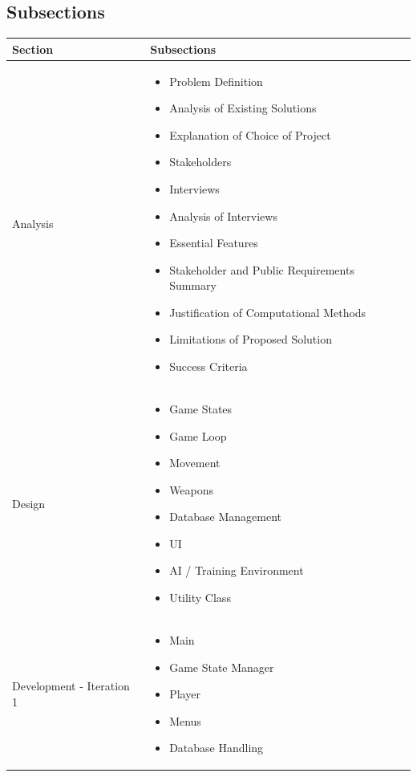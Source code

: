 \subsection{Subsections}

\begin{center}
\begin{longtable}{|p{3.5cm}|p{10cm}|}
    \hline
    Section & Subsections\\
    \hline
    \hline
    Analysis & \begin{itemize}
        \item Problem Definition
        \item Analysis of Existing Solutions
        \item Explanation of Choice of Project
        \item Stakeholders
        \item Interviews
        \item Analysis of Interviews
        \item Essential Features
        \item Stakeholder and Public Requirements Summary
        \item Justification of Computational Methods
        \item Limitations of Proposed Solution
        \item Success Criteria
    \end{itemize}\\
    \hline
    Design & \begin{itemize}
        \item Game States
        \item Game Loop
        \item Movement
        \item Weapons
        \item Database Management
        \item UI
        \item AI / Training Environment
        \item Utility Class
    \end{itemize}\\
    \hline
    Development - Iteration 1 & \begin{itemize}
        \item Main
        \item Game State Manager
        \item Player
        \item Menus
        \item Database Handling

\end{itemize}
\end{longtable}
\end{center}
